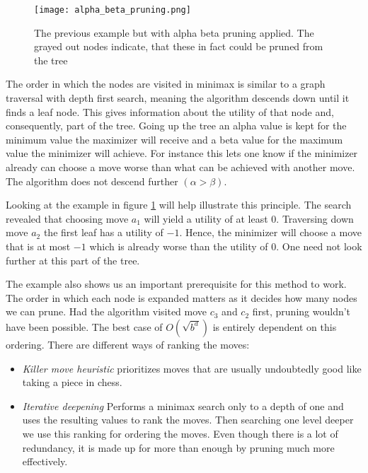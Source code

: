 \begin{figure}
    \centering
    \texttt{[image: alpha\_beta\_pruning.png]}
    \caption{The previous example but with alpha beta pruning applied. The grayed out nodes indicate, that these in fact could be pruned from the tree \cite[cf. p. 308]{russell_artificial_2021}}
    \label{alpha_beta_pruning}
\end{figure}

The order in which the nodes are visited in minimax is similar to a graph traversal with depth first search, meaning the algorithm descends down until it finds a leaf node. This gives information about the utility of that node and, consequently, part of the tree. Going up the tree an alpha value is kept for the minimum value the maximizer will receive and a beta value for the maximum value the minimizer will achieve. For instance this lets one know if the minimizer already can choose a move worse than what can be achieved with another move. The algorithm does not descend further $ (\alpha > \beta) $.

Looking at the example in figure \ref{alpha_beta_pruning} will help illustrate this principle. The search revealed that choosing move $ a_1 $ will yield a utility of at least $0$. Traversing down move $ a_2 $ the first leaf has a utility of $-1$. Hence, the minimizer will choose a move that is at most $-1$ which is already worse than the utility of $0$. One need not look further at this part of the tree.

The example also shows us an important prerequisite for this method to work. The order in which each node is expanded matters as it decides how many nodes we can prune. Had the algorithm visited move $ c_3 $ and $ c_2 $ first, pruning wouldn't have been possible. The best case of $ O(\sqrt{b^d}) $ is entirely dependent on this ordering. There are different ways of ranking the moves:

\begin{itemize}
    \item \textit{Killer move heuristic} prioritizes moves that are usually undoubtedly good like taking a piece in chess.
    \item \textit{Iterative deepening} Performs a minimax search only to a depth of one and uses the resulting values to rank the moves. Then searching one level deeper we use this ranking for ordering the moves. Even though there is a lot of redundancy, it is made up for more than enough by pruning much more effectively.
\end{itemize}

